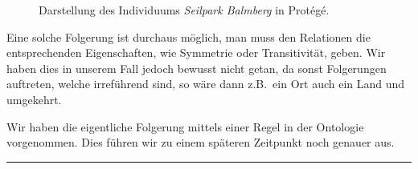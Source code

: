 \begin{figure}[H]
\centering {}
\caption{Darstellung des Individuums \textit{Seilpark Balmberg} in Protégé.\label{fig:inferenz_protege}\protect\footnotemark}
\end{figure}

Eine solche Folgerung ist durchaus möglich, man muss den Relationen die entsprechenden Eigenschaften, wie Symmetrie oder Transitivität, geben. Wir haben dies in unserem Fall jedoch bewusst nicht getan, da sonst Folgerungen auftreten, welche irreführend sind, so wäre dann z.B.\ ein Ort auch ein Land und umgekehrt.

Wir haben die eigentliche Folgerung mittels einer Regel in der Ontologie vorgenommen. Dies führen wir zu einem späteren Zeitpunkt noch genauer aus.

\noindent\rule[1ex]{\textwidth}{1pt}
